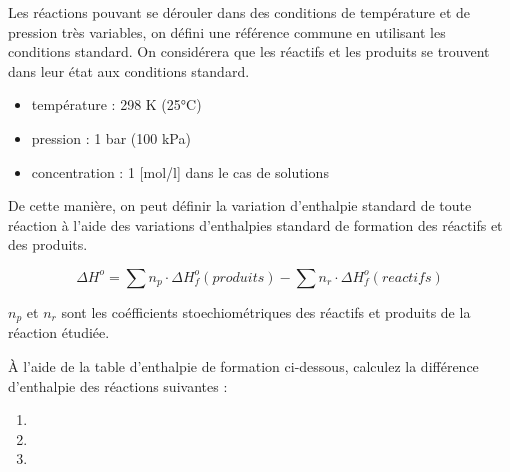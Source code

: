 \documentclass[
  11pt,
  a4paper,
  openany]{book}
\providecommand{\tightlist}{%
  \setlength{\itemsep}{0pt}\setlength{\parskip}{0pt}}
\begin{document}
Les réactions pouvant se dérouler dans des conditions de température et de pression très variables, on défini une référence commune en utilisant les conditions standard. On considérera que les réactifs et les produits se trouvent dans leur état aux conditions standard.

\begin{itemize}
\tightlist
\item
  température : 298 K (25°C)
\item
  pression : 1 bar (100 kPa)
\item
  concentration : 1 {[}mol/l{]} dans le cas de solutions
\end{itemize}

De cette manière, on peut définir la variation d'enthalpie standard de toute réaction à l'aide des variations d'enthalpies standard de formation des réactifs et des produits.

\[
\Delta H^o = \sum n_p \cdot \Delta H^{o}_f(produits) - \sum n_r \cdot \Delta H^{o}_f(reactifs)
\]

\(n_p\) et \(n_r\) sont les coéfficients stoechiométriques des réactifs et produits de la réaction étudiée.

\begin{Exercise}

À l'aide de la table d'enthalpie de formation ci-dessous, calculez la différence d'enthalpie des réactions suivantes :

\begin{enumerate}
\def\labelenumi{\arabic{enumi}.}
\item
\item
\item
\end{enumerate}

\end{Exercise}
\end{document}
